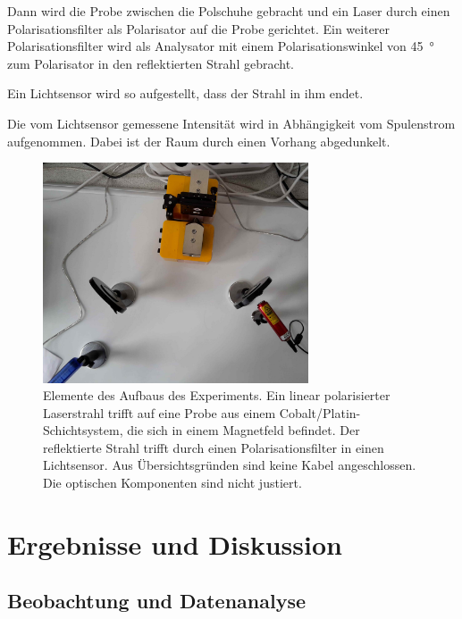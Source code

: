 \documentclass[
	a4paper,
	12pt,
	pagesize,
	ngerman
]{scrartcl}
\begin{document}
	Dann wird die Probe zwischen die Polschuhe gebracht und ein Laser durch einen Polarisationsfilter als Polarisator auf die Probe gerichtet.
	Ein weiterer Polarisationsfilter wird als Analysator mit einem Polarisationswinkel von \SI{45}{\degree} zum Polarisator in den reflektierten Strahl gebracht.%

	Ein Lichtsensor wird so aufgestellt, dass der Strahl in ihm endet.
	
	Die vom Lichtsensor gemessene Intensität wird in Abhängigkeit vom Spulenstrom aufgenommen.
	Dabei ist der Raum durch einen Vorhang abgedunkelt.
	
	\begin{figure}[H] 
		\includegraphics[width=0.7\textwidth]{O4_Aufbau}
		\centering
		\caption{Elemente des Aufbaus des Experiments. Ein linear polarisierter Laserstrahl trifft auf eine Probe aus einem Cobalt/Platin-Schichtsystem, die sich in einem Magnetfeld befindet. Der reflektierte Strahl trifft durch einen Polarisationsfilter in einen Lichtsensor. Aus Übersichtsgründen sind keine Kabel angeschlossen. Die optischen Komponenten sind nicht justiert.} 
		\label{fig_aufbau}
		\centering
	\end{figure}
	
	\section{Ergebnisse und Diskussion}
	

	\subsection{Beobachtung und Datenanalyse}
\end{document}

